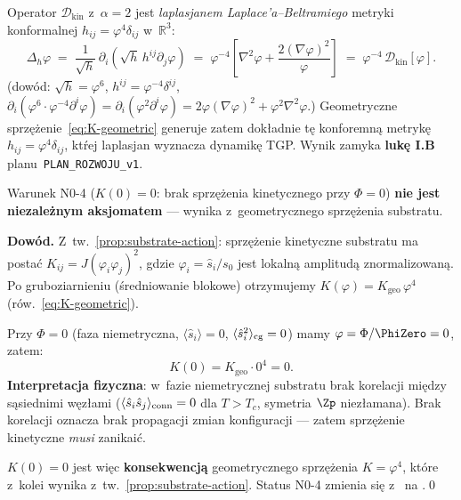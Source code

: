 \begin{remark}%
\label{rem:LB-alpha2}
Operator $\mathcal{D}_{\mathrm{kin}}$ z~$\alpha = 2$
jest \emph{laplasjanem Laplace'a--Beltramiego}
metryki konformalnej $h_{ij} = \varphi^4\delta_{ij}$ w~$\mathbb{R}^3$:
\begin{equation}
  \Delta_{h}\varphi
  \;=\; \frac{1}{\sqrt{h}}\,\partial_i\!\left(\sqrt{h}\,h^{ij}\partial_j\varphi\right)
  \;=\; \varphi^{-4}
    \left[\nabla^2\varphi + \frac{2(\nabla\varphi)^2}{\varphi}\right]
  \;=\; \varphi^{-4}\,\mathcal{D}_{\mathrm{kin}}[\varphi].
\end{equation}
(dow\'od: $\sqrt{h} = \varphi^6$, $h^{ij} = \varphi^{-4}\delta^{ij}$,
$\partial_i(\varphi^6\cdot\varphi^{-4}\partial^i\varphi)
= \partial_i(\varphi^2\partial^i\varphi)
= 2\varphi(\nabla\varphi)^2 + \varphi^2\nabla^2\varphi$.)
Geometryczne sprz\k{e}\.zenie~\eqref{eq:K-geometric}
generuje zatem dok\l{}adnie t\k{e} konforemn\k{a} metryk\k{e}
$h_{ij} = \varphi^4\delta_{ij}$, kt\'rej laplasjan wyznacza
dynamik\k{e} TGP.
Wynik zamyka \textbf{luk\k{e} I.B} planu~\texttt{PLAN\_ROZWOJU\_v1}.
\end{remark}

\begin{proposition}[Wyprowadzenie N0-4: $K(0) = 0$ z~substratu]%
\label{prop:K0-from-substrate}\label{ssec:formalizm-zamkniecie}

Warunek N0-4 ($K(0) = 0$: brak sprz\k{e}\.zenia kinetycznego
przy $\Phi = 0$) \textbf{nie jest niezale\.znym aksjomatem} ---
wynika z~geometrycznego sprz\k{e}\.zenia substratu.

\medskip\noindent
\textbf{Dow\'od.}\;
Z~tw.~\ref{prop:substrate-action}: sprz\k{e}\.zenie kinetyczne
substratu ma posta\'c $K_{ij} = J(\varphi_i \varphi_j)^2$,
gdzie $\varphi_i = \hat{s}_i / s_0$ jest lokaln\k{a} amplitud\k{a}
znormalizowan\k{a}. Po gruboziarnieniu (\'sredniowanie blokowe)
otrzymujemy $K(\varphi) = K_{\mathrm{geo}}\,\varphi^4$
(r\'ow.~\eqref{eq:K-geometric}).

Przy $\Phi = 0$ (faza niemetryczna, $\langle\hat{s}_i\rangle = 0$,
$\langle\hat{s}_i^2\rangle_{\rm cg} = 0$) mamy $\varphi = \Phi/\PhiZero = 0$,
zatem:
\begin{equation}\label{eq:K0-derived}
  K(0) = K_{\mathrm{geo}} \cdot 0^4 = 0.
\end{equation}
\textbf{Interpretacja fizyczna}: w~fazie niemetrycznej substratu
brak korelacji mi\k{e}dzy s\k{a}siednimi w\k{e}z\l{}ami
($\langle\hat{s}_i\hat{s}_j\rangle_{\rm conn} = 0$
dla $T > T_c$, symetria $\Zp$ niez\l{}amana).
Brak korelacji oznacza brak propagacji zmian konfiguracji ---
zatem sprz\k{e}\.zenie kinetyczne \emph{musi} zanikai\'c.

$K(0) = 0$ jest wi\k{e}c \textbf{konsekwencj\k{a}} geometrycznego
sprz\k{e}\.zenia $K = \varphi^4$, kt\'ore z~kolei wynika
z~tw.~\ref{prop:substrate-action}. Status N0-4 zmienia si\k{e}
z~ na .\qed
\end{proposition}


